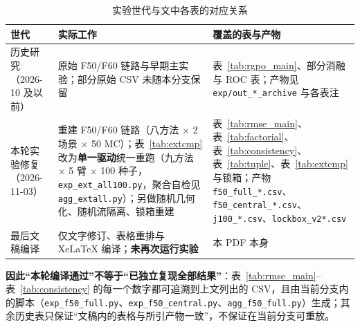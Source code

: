 \documentclass[UTF8,a4paper,zihao=-4]{ctexart}
\begin{document}
\begin{table}[htbp]\centering\small
\caption{实验世代与文中各表的对应关系}\label{tab:repro-gen}
\begin{tabular}{@{}p{2.6cm}p{5.2cm}p{6.4cm}@{}}\toprule
世代 & 实际工作 & 覆盖的表与产物 \\ \midrule
历史研究（2026-10 及以前） & 原始 F50/F60 链路与早期主实验；部分原始 CSV 未随本分支保留 & 表~\ref{tab:rgpo_main}、部分消融与 ROC 表；产物见 \texttt{exp/out\_*\_archive} 与各表注 \\ \midrule
本轮实验修复（2026-11-03） & 重建 F50/F60 链路（八方法 $\times$ 2 场景 $\times$ 50 MC）；表~\ref{tab:extcmp} 改为\textbf{单一驱动}统一重跑（九方法 $\times$ 5 臂 $\times$ 100 种子，\texttt{exp\_ext\_all100.py}，聚合自检见 \texttt{agg\_extall.py}）；另做随机几何化、随机流隔离、锁箱重建 & 表~\ref{tab:rmse_main}、表~\ref{tab:factorial}、表~\ref{tab:consistency}、表~\ref{tab:tuple}、表~\ref{tab:extcmp} 与锁箱；产物 \texttt{f50\_full\_*.csv}、\texttt{f50\_central\_*.csv}、\texttt{j100\_*.csv}、\texttt{lockbox\_v2*.csv} \\ \midrule
最后文稿编译 & 仅文字修订、表格重排与 XeLaTeX 编译；\textbf{未再次运行实验} & 本 PDF 本身 \\ \bottomrule
\end{tabular}\end{table}

\textbf{因此“本轮编译通过”不等于“已独立复现全部结果”}：表~\ref{tab:rmse_main}--表~\ref{tab:consistency} 的每一个数字都可追溯到上文列出的 CSV，且由当前分支内的脚本（\texttt{exp\_f50\_full.py}、\texttt{exp\_f50\_central.py}、\texttt{agg\_f50\_full.py}）生成；其余历史表只保证“文稿内的表格与所引产物一致”，不保证在当前分支可重放。
\end{document}
